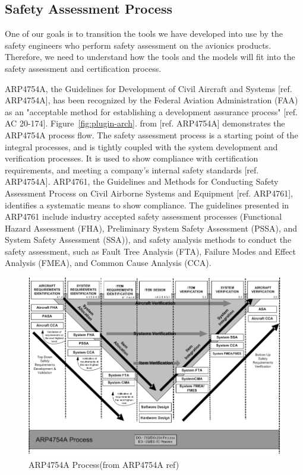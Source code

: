 \subsection{Safety Assessment Process}
\label{subsec:process}

One of our goals is to transition the tools we have developed into use by the safety engineers who perform safety assessment on the avionics products. Therefore, we need to understand how the tools and the models will fit into the safety assessment and certification process.

ARP4754A, the Guidelines for Development of Civil Aircraft and Systems [ref. ARP4754A], has been recognized by the Federal Aviation Administration (FAA) as an "acceptable method for establishing a development assurance process" [ref. AC 20-174]. Figure~\ref{fig:plugin-arch}. from [ref. ARP4754A] demonstrates the ARP4754A process flow. The safety assessment process is a starting point of the integral processes, and is tightly coupled with the system development and verification processes. It is used to show compliance with certification requirements, and meeting a company's internal safety standards [ref. ARP4754A]. ARP4761, the Guidelines and Methods for Conducting Safety Assessment Process on Civil Airborne Systems and Equipment [ref. ARP4761], identifies a systematic means to show compliance. The guidelines presented in ARP4761 include industry accepted safety assessment processes (Functional Hazard Assessment (FHA), Preliminary System Safety Assessment (PSSA), and System Safety Assessment (SSA)), and safety analysis methods to conduct the safety assessment, such as Fault Tree Analysis (FTA), Failure Modes and Effect Analysis (FMEA), and Common Cause Analysis (CCA). 

\begin{figure}[h!]
	\vspace{-0.19in}
	\begin{center}
		\includegraphics[trim=0 9 0 5,clip,width=1.0\textwidth]{images/ARP4754A_Process.png}
	\end{center}
	\caption{ARP4754A Process(from ARP4754A ref)}
	\label{fig:arp4754a_process}
\end{figure}

